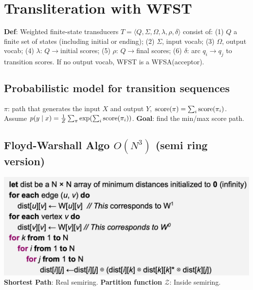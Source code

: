 \section{Transliteration with WFST}



\textbf{Def}: Weighted finite-state transducers $T=\langle Q, \Sigma, \Omega, \lambda, \rho, \delta\rangle$ consist of: (1) $Q$ a finite set of states (including initial or ending); (2) $\Sigma$, input vocab; (3) $\Omega$, output vocab; (4) $\lambda$: $Q\to$initial scores; (5) $\rho$: $Q\to$final scores; (6) $\delta$: arc $q_i\to q_j$ to transition scores. If no output vocab, WFST is a WFSA(acceptor).

\subsection*{Probabilistic model for transition sequences}
$\pi$: path that generates the input $X$ and output $Y$, $\text{score}(\pi) = \sum_i \text{score}(\pi_i)$. Assume $p(y\mid x)=\frac{1}{Z} \sum_\pi \exp(\sum_i \text{score}(\pi_i))$. \textbf{Goal}: find the min/max score path.

\subsection*{Floyd-Warshall Algo $O(N^3)$ (semi ring version)}
\includegraphics[width=\columnwidth]{img/FWalgoSemiRing.png}
\textbf{Shortest Path}: Real semiring. \textbf{Partition function $\mathcal{Z}$}: Inside semiring.

